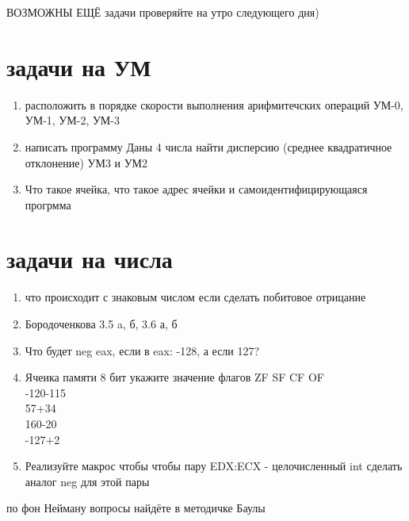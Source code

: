 \documentclass[a4paper,10pt]{article}
\begin{document}
ВОЗМОЖНЫ ЕЩЁ задачи проверяйте на утро следующего дня)

\section*{задачи на УМ}
\begin{enumerate}
    \item расположить в порядке скорости выполнения арифмитечских операций УМ-0, УМ-1, УМ-2, УМ-3
    \item написать программу Даны 4 числа найти дисперсию (среднее квадратичное отклонение) УМ3 и УМ2
    \item Что такое ячейка, что такое адрес ячейки и самоидентифицирующаяся прогрмма
\end{enumerate}

\section*{задачи на числа}
\begin{enumerate}
    \item что происходит с знаковым числом если сделать побитовое отрицание
    \item Бородоченкова 3.5 a, б, 3.6 а, б
    \item Что будет neg eax, если в eax: -128, а если 127? 
    \item Ячеика памяти 8 бит укажите значение флагов ZF SF CF OF \\
    -120-115\\
    57+34\\
    160-20\\
    -127+2\\
    \item Реализуйте макрос чтобы чтобы пару EDX:ECX - целочисленный int сделать аналог neg для этой пары
\end{enumerate}
 
по фон Нейману вопросы найдёте в методичке Баулы
\end{document}
